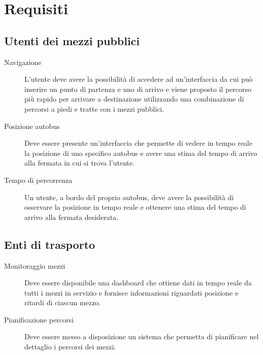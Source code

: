 \section{Requisiti}

\subsection{Utenti dei mezzi pubblici}

\begin{description}
    \item [Navigazione] L'utente deve avere la possibilità di accedere ad un'interfaccia da cui può inserire un punto di partenza e uno di arrivo e viene proposto il percorso più rapido per arrivare a destinazione utilizzando una combinazione di percorsi a piedi e tratte con i mezzi pubblici.
    \item [Posizione autobus] Deve essere presente un'interfaccia che permette di vedere in tempo reale la posizione di uno specifico autobus e avere una stima del tempo di arrivo alla fermata in cui si trova l'utente.
    \item [Tempo di percorrenza] Un utente, a bordo del proprio autobus, deve avere la possibilità di osservare la posizione in tempo reale e ottenere una stima del tempo di arrivo alla fermata desiderata.
\end{description}

\subsection{Enti di trasporto}

\begin{description}
    \item[Monitoraggio mezzi] Deve essere disponibile una dashboard che ottiene dati in tempo reale da tutti i mezzi in servizio e fornisce informazioni riguardati posizione e ritardi di ciascun mezzo.
    \item[Pianificazione percorsi] Deve essere messo a disposizione un sistema che permetta di pianificare nel dettaglio i percorsi dei mezzi.
\end{description}

